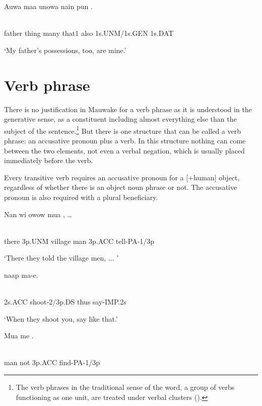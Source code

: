\ea%
\label{ex:x847}
\gll Auwa  maa  unowa  nain  pun  . \\
      \\
\glt
\z

father  thing  many  that1  also  1s.UNM/1s.GEN  1s.DAT

`My father's possessions, too, are mine.'

\section{Verb phrase}
{}
There is no justification in Mauwake for a verb phrase as it is understood in the generative sense, as a constituent including almost everything else than the subject of the sentence.\footnote{The verb phrases in the traditional sense of the word, a group of verbs functioning as one unit, are treated under verbal clusters ().}  But there is one structure that can be called a verb phrase: an accusative pronoun plus a verb.  In this structure nothing can come between the two elements, not even a verbal negation, which is usually placed immediately before the verb.

Every transitive verb requires an accusative pronoun for a [+human] object, regardless of whether there is an object noun phrase or not. The accusative pronoun is also required with a plural beneficiary. 

\ea%
\label{ex:x848}
\gll Nan  wi  owow  mua  ,  {\dots} \\
      \\
\glt
\z

there  3p.UNM  village  man  3p.ACC  tell-PA-1/3p

`There they told the village men, ... '

\ea%
\label{ex:x852}
\gll {}  naap  ma-e. \\
      \\
\glt
\z

2s.ACC  shoot-2/3p.DS  thus  say-IMP.2s

`When they shoot you, say like that.'

\ea%
\label{ex:x849}
\gll Mua  me  . \\
      \\
\glt
\z

man  not  3p.ACC  find-PA-1/3p

